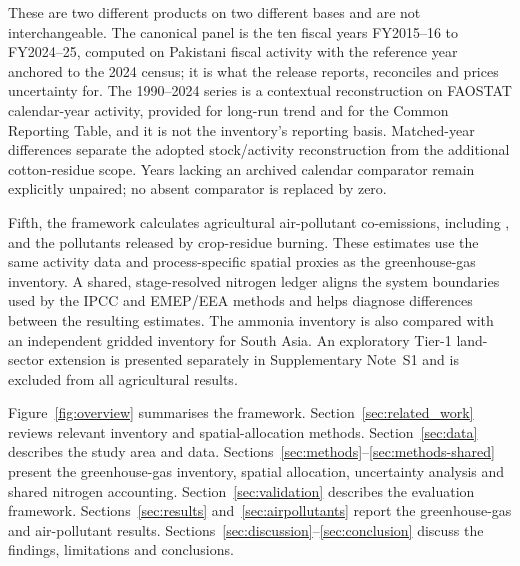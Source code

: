 These are two different products on two different bases and are not interchangeable. The
canonical panel is the ten fiscal years FY2015--16 to FY2024--25, computed on Pakistani
fiscal activity with the reference year anchored to the 2024 census; it is what the release
reports, reconciles and prices uncertainty for. The 1990--2024 series is a contextual
reconstruction on FAOSTAT calendar-year activity, provided for long-run trend and for the
Common Reporting Table, and it is not the inventory's reporting basis. Matched-year differences separate the adopted stock/activity reconstruction from
the additional cotton-residue scope. Years lacking an archived calendar comparator
remain explicitly unpaired; no absent comparator is replaced by zero.

Fifth, the framework calculates agricultural air-pollutant co-emissions, including
\NHthree{}, \NOx{} and the pollutants released by crop-residue burning. These estimates use
the same activity data and process-specific spatial proxies as the greenhouse-gas
inventory. A shared, stage-resolved nitrogen ledger aligns the system boundaries used by
the IPCC and EMEP/EEA methods and helps diagnose differences between the resulting
estimates. The ammonia inventory is also compared with an independent gridded inventory for
South Asia. An exploratory Tier-1 land-sector extension is presented separately in
Supplementary Note~S1 and is excluded from all agricultural results.

Figure~\ref{fig:overview} summarises the framework. Section~\ref{sec:related_work} reviews
relevant inventory and spatial-allocation methods. Section~\ref{sec:data} describes the
study area and data. Sections~\ref{sec:methods}--\ref{sec:methods-shared} present the
greenhouse-gas inventory, spatial allocation, uncertainty analysis and shared nitrogen
accounting. Section~\ref{sec:validation} describes the evaluation framework.
Sections~\ref{sec:results} and~\ref{sec:airpollutants} report the greenhouse-gas and
air-pollutant results. Sections~\ref{sec:discussion}--\ref{sec:conclusion} discuss the
findings, limitations and conclusions.

